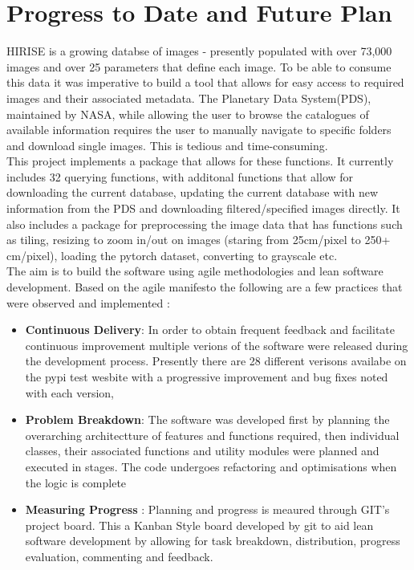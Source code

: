 \documentclass[project-plan]{report-template}
\begin{document}
\section{Progress to Date and Future Plan}
 HIRISE is a growing databse of images - presently populated with over 73,000 images and over 25 parameters that define each image. To be able to consume this data it was imperative to build a tool that allows for easy access to required images and their associated metadata. The Planetary Data System(PDS), maintained by NASA, while allowing the user to browse the catalogues of available information requires the user to manually navigate to specific folders and download single images. This is tedious and time-consuming. \\
 This project implements a package that allows for these functions. It currently includes 32 querying functions, with additonal functions that allow for downloading the current database, updating the current database with new information from the PDS and downloading filtered/specified images directly. It also includes a package for preprocessing the image data that has functions such as tiling, resizing to zoom in/out on images (staring from 25cm/pixel to 250+ cm/pixel), loading the pytorch dataset, converting to grayscale etc. \\

 The aim is to build the software using agile methodologies and lean software development. Based on the agile manifesto the following are a few practices that were observed and implemented : \\
 \begin{itemize}
    \item \textbf{Continuous Delivery}: In order to obtain frequent feedback and facilitate continuous improvement multiple verions of the software were released during the development process. Presently there are 28 different verisons availabe on the pypi test wesbite with a progressive improvement and bug fixes noted with each version,
    \item \textbf{Problem Breakdown}: The software was developed first by planning the overarching architectture of features and functions required, then  individual classes, their associated functions and utility modules were planned and executed in stages. The code undergoes refactoring and optimisations when the logic is complete
    \item \textbf{Measuring Progress} : Planning and progress is meaured through GIT's project board. This a Kanban Style board developed by git to aid lean software development by allowing for task breakdown, distribution, progress evaluation, commenting  and feedback.
 \end{itemize}
\end{document}
